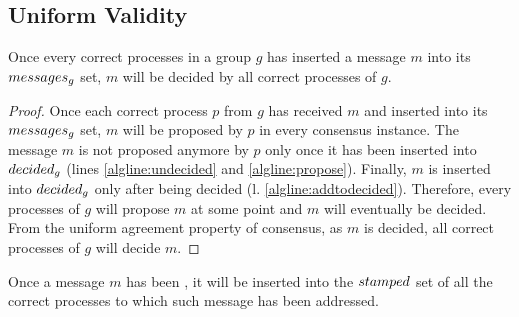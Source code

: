 \documentclass[times, 10pt]{article}
\begin{document}
\subsection{Uniform Validity}




\begin{lems} \label{lemma:mcastdecided}
Once every correct processes in a group $g$ has inserted a message $m$ into its $messages\text{$_g$}$ set, $m$ will be decided by all correct processes of $g$.
\end{lems}

\begin{proof}
Once each correct process $p$ from $g$ has received $m$ and inserted into its $messages\text{$_g$}$ set, $m$ will be proposed by $p$ in every consensus instance. The message $m$ is not proposed anymore by $p$ only once it has been inserted into $decided\text{$_g$}$ (lines \ref{algline:undecided} and \ref{algline:propose}). Finally, $m$ is inserted into $decided\text{$_g$}$ only after being decided (l. \ref{algline:addtodecided}). Therefore, every processes of $g$ will propose $m$ at some point and $m$ will eventually be decided. From the uniform agreement property of consensus, as $m$ is decided, all correct processes of $g$ will decide $m$.
\end{proof}







\begin{lems} \label{lemma:mcastbarpending}
Once a message $m$ has been \amcast{}, it will be inserted into the $stamped$ set of all the correct processes to which such message has been addressed.
\end{lems}
\end{document}
